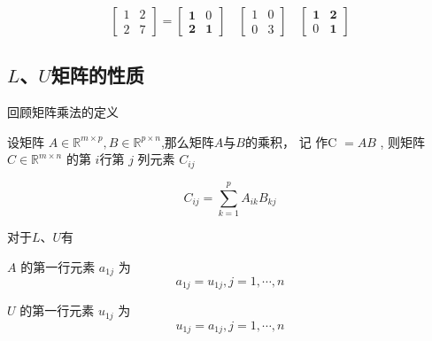\begin{example}
    \begin{equation} \left[\begin{array}{ll}1 & 2 \\ 2 & 7\end{array}\right]=\left[\begin{array}{ll}\mathbf{1} & 0 \\ \mathbf{2} & \mathbf{1}\end{array}\right] \quad\left[\begin{array}{ll}1 & 0 \\ 0 & 3\end{array}\right] \quad\left[\begin{array}{ll}\mathbf{1} & \mathbf{2} \\ 0 & \mathbf{1}\end{array}\right] \end{equation}
\end{example}


\subsection{$L$、$U$矩阵的性质}

回顾矩阵乘法的定义

\begin{definition}[矩阵乘法]
    设矩阵 $ A \in \mathbb{R}^{m \times p}, B \in \mathbb{R}^{p \times n} $,那么矩阵$A$与$B$的乘积， 记 作C $ =A B $ ,  则矩阵 $ C \in \mathbb{R}^{m \times n} $ 的第 $i$行第 $ j $ 列元素 $ C_{i j} $


    \begin{equation}
{C}_{i j}=\sum_{k=1}^{p} A_{i k} B_{k j}
\end{equation}
\end{definition}

对于$L$、$U$有

\begin{theorem}
    $ A $ 的第一行元素 $ a_{1 j} $ 为
    \begin{equation}
        a_{1 j}=u_{1 j}, j=1, \cdots, n
    \end{equation}
\end{theorem}

\begin{corollary}
    $ U $ 的第一行元素 $ u_{1 j} $ 为
    \begin{equation}
        u_{1 j}=a_{1 j}, j=1, \cdots, n
    \end{equation}
\end{corollary}

